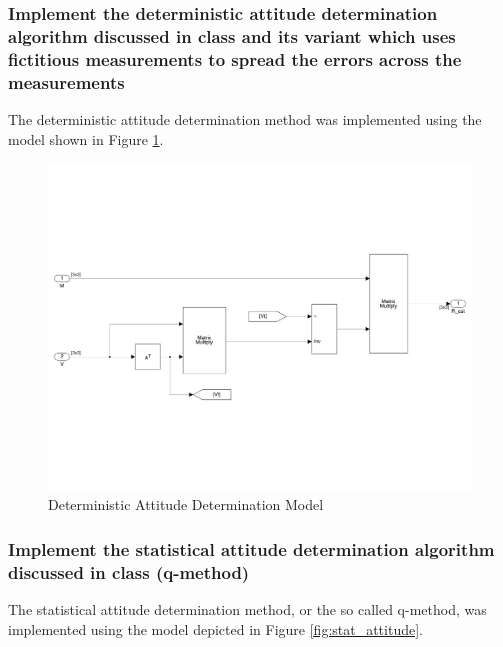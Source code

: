 \subsubsection{Implement the deterministic attitude determination algorithm discussed in class and its variant which uses fictitious measurements to spread the errors across the measurements}

The deterministic attitude determination method was implemented using the model shown in Figure \ref{fig:det_attitude}.

\begin{figure}[H]
    \centering
    \captionsetup{ justification = centering }
    \includegraphics[trim={0.25cm 3cm 0.25cm 5cm},clip,width = 15cm]{Images/PS6/deterministicAttitude-1.png}
    \caption{Deterministic Attitude Determination Model}
    \label{fig:det_attitude}
\end{figure}

\subsubsection{Implement the statistical attitude determination algorithm discussed in class (q-method)}

The statistical attitude determination method, or the so called q-method, was implemented using the model depicted in Figure \ref{fig:stat_attitude}. 

